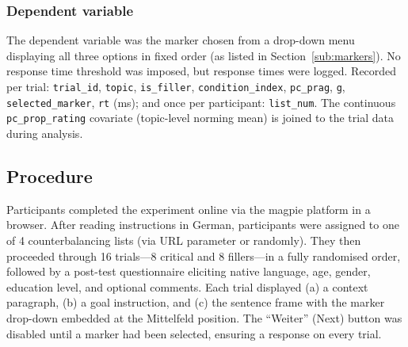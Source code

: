 \documentclass[12pt]{article}
\begin{document}
\subsubsection{Dependent variable}

The dependent variable was the marker chosen from a drop-down menu
displaying all three options in fixed order (as listed in
Section~\ref{sub:markers}).
No response time threshold was imposed, but response times were logged.
Recorded per trial: \texttt{trial\_id}, \texttt{topic}, \texttt{is\_filler},
\texttt{condition\_index}, \texttt{pc\_prag}, \texttt{g},
\texttt{selected\_marker}, \texttt{rt} (ms); and once per participant:
\texttt{list\_num}.
The continuous \texttt{pc\_prop\_rating} covariate (topic-level norming mean)
is joined to the trial data during analysis.

\subsection{Procedure}

Participants completed the experiment online via the
magpie platform \citep{kochetkova2024magpie} in a browser.
After reading instructions in German, participants were assigned to one
of 4 counterbalancing lists (via URL parameter or randomly).
They then proceeded through 16 trials---8 critical and 8 fillers---in a
fully randomised order, followed by a post-test questionnaire eliciting
native language, age, gender, education level, and optional comments.
Each trial displayed (a) a context paragraph, (b) a goal instruction,
and (c) the sentence frame with the marker drop-down embedded at the
Mittelfeld position.
The ``Weiter'' (Next) button was disabled until a marker had been
selected, ensuring a response on every trial.
\end{document}
